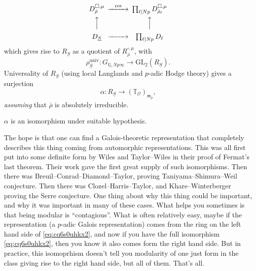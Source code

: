 \documentclass[reqno]{amsart} 
\numberwithin{theorem}{section}
\numberwithin{equation}{section}
\numberwithin{exercise}{section}
\begin{document}
\begin{equation*}
  \begin{CD}         
    D_{\bar{\rho}}^{\square, \mu} @> \res>> \prod_{\ell \mid N p}
    D_{\bar{\rho}_{\ell}}^{\square, \mu}\\
    @AAA  @AAA \\
    D_{\underline{S}}    @>>> \prod_{\ell \mid N p} D_{\ell}\\
  \end{CD}
\end{equation*}
which gives rise to $R_{\underline{S}}$ as a quotient of $R_{\bar{\rho}}^{\square, \mu}$, with
\begin{equation*}
  \rho_{\underline{S}}^{\mathrm{univ}} : G_{\mathbb{Q}, N p \infty} \rightarrow \mathrm{GL}_2(R_{\underline{S}}).
\end{equation*}
Universality of $R_{\underline{S}}$ (using local Langlands and $p$-adic Hodge theory) gives a surjection
\begin{equation}\label{eq:cq6s0uhkx2}
  \alpha : R_{\underline{S}} \rightarrow(\mathbb{T}_{\mathcal{O}})_{\mathfrak{m}_{\bar{\rho}}},
\end{equation}
\emph{assuming} that $\bar{\rho}$ is absolutely irreducible.
\begin{conjecture}\label{conjecture:cq6thpclm1}
  $\alpha$ is an isomorphism under suitable hypothesis.
\end{conjecture}
The hope is that one can find a Galois-theoretic representation that completely describes this thing coming from automorphic representations.  This was all first put into some definite form by Wiles and Taylor--Wiles in their proof of Fermat's last theorem.  Their work gave the first great supply of such isomorphisms.  Then there was Breuil--Conrad--Diamond--Taylor, proving Taniyama--Shimura--Weil conjecture.  Then there was Clozel--Harris--Taylor, and Khare--Winterberger proving the Serre conjecture.  One thing about why this thing could be important, and why it was important in many of these cases.  What helps you sometimes is that being modular is ``contagious''.  What is often relatively easy, maybe if the representation (a $p$-adic Galois representation) comes from the ring on the left hand side of \eqref{eq:cq6s0uhkx2}, and now if you have the full isomorphism \eqref{eq:cq6s0uhkx2}, then you know it also comes form the right hand side.  But in practice, this isomoprhism doesn't tell you modularity of one just form in the class giving rise to the right hand side, but all of them.  That's all.
\end{document}
